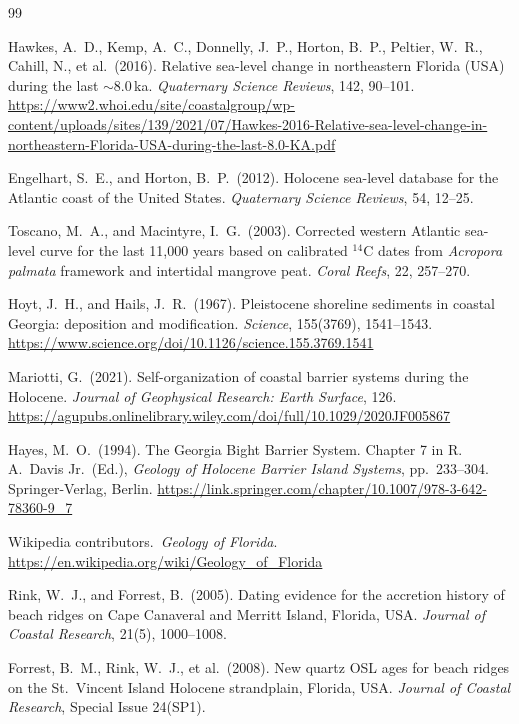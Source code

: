 \documentclass[11pt]{article}
\begin{document}
\begin{thebibliography}{99}

Hawkes, A.~D., Kemp, A.~C., Donnelly, J.~P., Horton, B.~P., Peltier, W.~R.,
Cahill, N., et al.\ (2016).
Relative sea-level change in northeastern Florida (USA) during the last
$\sim$8.0\,ka.
\emph{Quaternary Science Reviews}, 142, 90--101.
\url{https://www2.whoi.edu/site/coastalgroup/wp-content/uploads/sites/139/2021/07/Hawkes-2016-Relative-sea-level-change-in-northeastern-Florida-USA-during-the-last-8.0-KA.pdf}

Engelhart, S.~E., and Horton, B.~P.\ (2012).
Holocene sea-level database for the Atlantic coast of the United States.
\emph{Quaternary Science Reviews}, 54, 12--25.

Toscano, M.~A., and Macintyre, I.~G.\ (2003).
Corrected western Atlantic sea-level curve for the last 11{,}000 years based on
calibrated $^{14}$C dates from \emph{Acropora palmata} framework and intertidal
mangrove peat.
\emph{Coral Reefs}, 22, 257--270.

Hoyt, J.~H., and Hails, J.~R.\ (1967).
Pleistocene shoreline sediments in coastal Georgia: deposition and modification.
\emph{Science}, 155(3769), 1541--1543.
\url{https://www.science.org/doi/10.1126/science.155.3769.1541}

Mariotti, G.\ (2021).
Self-organization of coastal barrier systems during the Holocene.
\emph{Journal of Geophysical Research: Earth Surface}, 126.
\url{https://agupubs.onlinelibrary.wiley.com/doi/full/10.1029/2020JF005867}

Hayes, M.~O.\ (1994).
The Georgia Bight Barrier System.
Chapter 7 in R.\,A.\ Davis Jr.\ (Ed.), \emph{Geology of Holocene Barrier
Island Systems}, pp.\ 233--304. Springer-Verlag, Berlin.
\url{https://link.springer.com/chapter/10.1007/978-3-642-78360-9_7}

Wikipedia contributors.\ \emph{Geology of Florida}.
\url{https://en.wikipedia.org/wiki/Geology_of_Florida}

Rink, W.~J., and Forrest, B.\ (2005).
Dating evidence for the accretion history of beach ridges on Cape Canaveral and
Merritt Island, Florida, USA.
\emph{Journal of Coastal Research}, 21(5), 1000--1008.

Forrest, B.~M., Rink, W.~J., et al.\ (2008).
New quartz OSL ages for beach ridges on the St.\ Vincent Island Holocene
strandplain, Florida, USA.
\emph{Journal of Coastal Research}, Special Issue 24(SP1).


\end{thebibliography}
\end{document}

